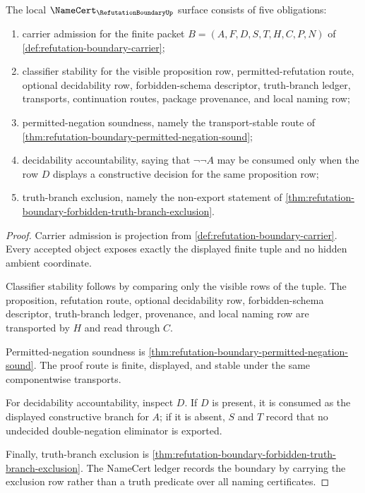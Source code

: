 \begin{theorem}
\label{thm:refutation-boundary-namecert-obligations}
The local $\NameCert_{\RefutationBoundaryUp}$ surface consists of five obligations:
\begin{enumerate}
\item carrier admission for the finite packet $B=(A,F,D,S,T,H,C,P,N)$ of \autoref{def:refutation-boundary-carrier};
\item classifier stability for the visible proposition row, permitted-refutation route, optional decidability row, forbidden-schema descriptor, truth-branch ledger, transports, continuation routes, package provenance, and local naming row;
\item permitted-negation soundness, namely the transport-stable route of \autoref{thm:refutation-boundary-permitted-negation-sound};
\item decidability accountability, saying that $\neg\neg A$ may be consumed only when the row $D$ displays a constructive decision for the same proposition row;
\item truth-branch exclusion, namely the non-export statement of \autoref{thm:refutation-boundary-forbidden-truth-branch-exclusion}.
\end{enumerate}
\end{theorem}
\begin{proof}
Carrier admission is projection from \autoref{def:refutation-boundary-carrier}. Every accepted object exposes exactly the displayed finite tuple and no hidden ambient coordinate.

Classifier stability follows by comparing only the visible rows of the tuple. The proposition, refutation route, optional decidability row, forbidden-schema descriptor, truth-branch ledger, provenance, and local naming row are transported by $H$ and read through $C$.

Permitted-negation soundness is \autoref{thm:refutation-boundary-permitted-negation-sound}. The proof route is finite, displayed, and stable under the same componentwise transports.

For decidability accountability, inspect $D$. If $D$ is present, it is consumed as the displayed constructive branch for $A$; if it is absent, $S$ and $T$ record that no undecided double-negation eliminator is exported.

Finally, truth-branch exclusion is \autoref{thm:refutation-boundary-forbidden-truth-branch-exclusion}. The NameCert ledger records the boundary by carrying the exclusion row rather than a truth predicate over all naming certificates.
\end{proof}

